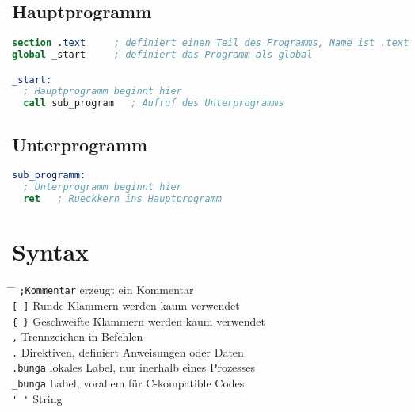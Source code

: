 \documentclass[a4paper,12pt,twoside]{article}
\begin{document}
\subsection{Hauptprogramm}
\begin{center}
  \begin{minipage}{1.0\textwidth}
    \begin{lstlisting}[language=NASM]
section .text     ; definiert einen Teil des Programms, Name ist .text
global _start     ; definiert das Programm als global

_start:
  ; Hauptprogramm beginnt hier 
  call sub_program   ; Aufruf des Unterprogramms 
    \end{lstlisting}
  \end{minipage}
\end{center}
\subsection{Unterprogramm}
\begin{center}
  \begin{minipage}{1.0\textwidth}
    \begin{lstlisting}[language=NASM]
sub_programm:
  ; Unterprogramm beginnt hier
  ret   ; Rueckkerh ins Hauptprogramm
    \end{lstlisting}
  \end{minipage}
\end{center}
\section{Syntax}
\begin{tabbing}
  \hspace{2mm} \= \hspace{50mm} \= \kill 
  \> \verb|;Kommentar| \> erzeugt ein Kommentar \\ 
  \> \verb|[ ]| \> Runde Klammern werden kaum verwendet \\ 
  \> \verb|{ }| \> Geschweifte Klammern werden kaum verwendet \\ 
  \> \verb|,| \> Trennzeichen in Befehlen \\
  \> \verb|.| \> Direktiven, definiert Anweisungen oder Daten \\ 
  \> \verb|.bunga| \> lokales Label, nur inerhalb eines Prozesses \\ 
  \> \verb|_bunga| \> Label, vorallem für C-kompatible Codes \\ 
  \> \verb|' '| \> String \\
\end{tabbing}
\end{document}
